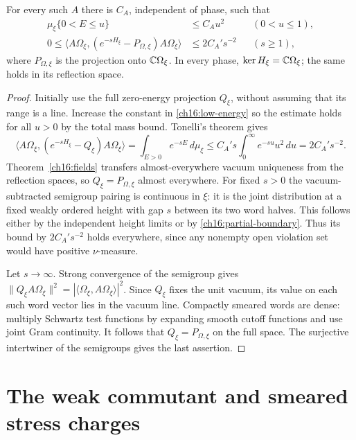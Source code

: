 \begin{theorem}
\label{ch16:vacuum}
For every such $A$ there is $C_A$, independent of phase, such that
\begin{align}
 \mu_\xi\{0<E\le u\}&\le C_Au^2 &&(0<u\le1),\label{ch16:low-energy}\\
 0\le\langle A\Omega_\xi,(e^{-sH_\xi}-P_{\Omega,\xi})A\Omega_\xi\rangle
       &\le 2C_A' s^{-2} &&(s\ge1),\label{ch16:heat-decay}
\end{align}
where $P_{\Omega,\xi}$ is the projection onto $\mathbb C\Omega_\xi$.
In every phase, $\ker H_\xi=\mathbb C\Omega_\xi$; the same holds in its
reflection space.
\end{theorem}
\begin{proof}
Initially use the full zero-energy projection $Q_\xi$, without assuming
that its range is a line. Increase the constant in
\eqref{ch16:low-energy} so the estimate holds for all $u>0$ by the total
mass bound. Tonelli's theorem gives
\[
 \langle A\Omega_\xi,(e^{-sH_\xi}-Q_\xi)A\Omega_\xi\rangle
 =\int_{E>0}e^{-sE}\,d\mu_\xi
 \le C_A's\int_0^\infty e^{-su}u^2\,du=2C_A's^{-2}.
\]
Theorem~\ref{ch16:fields} transfers almost-everywhere vacuum uniqueness
from the reflection spaces, so $Q_\xi=P_{\Omega,\xi}$ almost everywhere.
For fixed $s>0$ the vacuum-subtracted semigroup pairing is continuous in $\xi$:
it is the joint distribution at a fixed weakly ordered height with gap
$s$ between its two word halves. This follows either by the independent
height limits or by \eqref{ch16:partial-boundary}. Thus its bound by
$2C_A's^{-2}$ holds everywhere, since any nonempty open violation set
would have positive $\nu$-measure.

Let $s\to\infty$. Strong convergence of the semigroup gives
$\|Q_\xi A\Omega_\xi\|^2=|\langle\Omega_\xi,A\Omega_\xi\rangle|^2$.
Since $Q_\xi$ fixes the unit vacuum, its value on each such word vector
lies in the vacuum line. Compactly smeared words are dense: multiply
Schwartz test functions by expanding smooth cutoff functions and use joint Gram continuity.
It follows that $Q_\xi=P_{\Omega,\xi}$ on the full space. The surjective
intertwiner of the semigroups gives the last assertion.
\end{proof}

\section{The weak commutant and smeared stress charges}
\label{ch16:charges-section}

